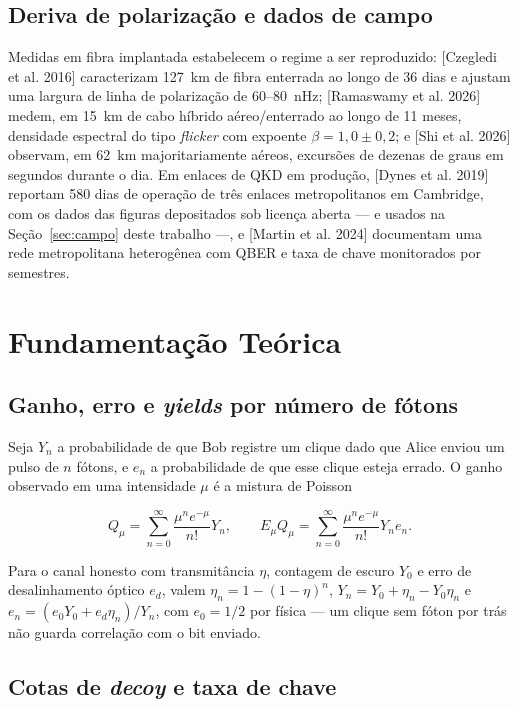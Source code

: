 \documentclass[12pt]{article}
\begin{document}
\subsection{Deriva de polarização e dados de campo}

Medidas em fibra implantada estabelecem o regime a ser reproduzido:
[Czegledi et al. 2016] caracterizam 127~km de fibra enterrada ao longo de 36 dias
e ajustam uma largura de linha de polarização de 60--80~nHz; [Ramaswamy et al.
2026] medem, em 15~km de cabo híbrido aéreo/enterrado ao longo de 11 meses,
densidade espectral do tipo \emph{flicker} com expoente $\beta = 1{,}0 \pm 0{,}2$;
e [Shi et al. 2026] observam, em 62~km majoritariamente aéreos, excursões de
dezenas de graus em segundos durante o dia. Em enlaces de QKD em produção,
[Dynes et al. 2019] reportam 580 dias de operação de três enlaces metropolitanos
em Cambridge, com os dados das figuras depositados sob licença aberta --- e
usados na Seção~\ref{sec:campo} deste trabalho ---, e [Martin et al. 2024] documentam uma
rede metropolitana heterogênea com QBER e taxa de chave monitorados por
semestres.

\section{Fundamentação Teórica}

\subsection{Ganho, erro e \emph{yields} por número de fótons}

Seja $Y_n$ a probabilidade de que Bob registre um clique dado que Alice enviou um
pulso de $n$ fótons, e $e_n$ a probabilidade de que esse clique esteja errado. O
ganho observado em uma intensidade $\mu$ é a mistura de Poisson

\begin{equation}
Q_\mu = \sum_{n=0}^{\infty} \frac{\mu^n e^{-\mu}}{n!} Y_n ,
\qquad
E_\mu Q_\mu = \sum_{n=0}^{\infty} \frac{\mu^n e^{-\mu}}{n!} Y_n e_n .
\end{equation}

Para o canal honesto com transmitância $\eta$, contagem de escuro $Y_0$ e erro de
desalinhamento óptico $e_d$, valem $\eta_n = 1 - (1-\eta)^n$,
$Y_n = Y_0 + \eta_n - Y_0\eta_n$ e $e_n = (e_0 Y_0 + e_d \eta_n)/Y_n$, com
$e_0 = 1/2$ por física --- um clique sem fóton por trás não guarda correlação com
o bit enviado.

\subsection{Cotas de \emph{decoy} e taxa de chave}
\label{sec:taxa}
\end{document}
